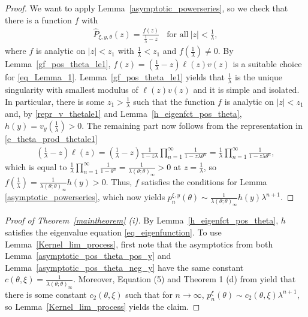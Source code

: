 \documentclass[10pt,a4paper]{amsart}
\newcommand{\1}{\mathds{1}}
\begin{document}
\begin{proof}
    We want to apply Lemma~\ref{asymptotic_powerseries}, so we check that there is a function $f$ with
    \begin{align}
        \hat{P}_{\xi,y,\theta}(z)=\frac{f(z)}{\frac{1}{\lambda}-z}~~~~\text{for all}~|z|<\frac{1}{\lambda}\label{eq_Lemma_1},
    \end{align}
   where $f$ is analytic on $|z|<z_1$ with $\frac{1}{\lambda}<z_1$ and $f\left(\frac{1}{\lambda}\right)\neq 0$. 
   By Lemma~\ref{gf_pos_theta_le1}, $f(z)=\left(\frac{1}{\lambda}-z\right)\ell(z)v(z)$  is a suitable choice for \eqref{eq_Lemma_1}. Lemma~\ref{gf_pos_theta_le1} yields that $\frac{1}{\lambda}$ is the unique singularity with smallest modulus of $\ell(z)v(z)$ and it is simple and isolated. In particular, there is some $z_1>\frac{1}{\lambda}$ such that the function $f$ is analytic on $|z|<z_1$ and, by \eqref{repr_v_thetale1} and Lemma~\ref{h_eigenfct_pos_theta}, $h(y)=v_y\left(\frac{1}{\lambda}\right)>0$. The remaining part now follows from the representation in \eqref{e_theta_prod_thetale1}
   \begin{align*}
       \left(\frac{1}{\lambda}-z\right)\ell(z)=\left(\frac{1}{\lambda}-z\right)\frac{1}{1-z\lambda}\prod_{n=1}^\infty\frac{1}{1-z\lambda \theta^n}=\frac{1}{\lambda}\prod_{n=1}^\infty\frac{1}{1-z\lambda \theta^n},
   \end{align*}
   which is equal to $\frac{1}{\lambda}\prod_{n=1}^\infty\frac{1}{1-\theta^n}=\frac{1}{\lambda(\theta;\theta)_\infty}>0$ at $z=\frac{1}{\lambda}$, so $f\left(\frac{1}{\lambda}\right)=\frac{1}{\lambda(\theta;\theta)_\infty}h(y)>0$.
  Thus, $f$ satisfies the  conditions for Lemma \ref{asymptotic_powerseries}, which now yields $p_n^{\xi,y}(\theta)\sim \frac{1}{\lambda(\theta;\theta)_\infty}h(y)\lambda^{n+1}$.
\end{proof}

\begin{proof}[Proof of Theorem~\ref{maintheorem} (i)]
    By Lem\-ma~\ref{h_eigenfct_pos_theta}, $h$ satisfies the eigenvalue equation \eqref{eq_eigenfunction}. To use Lem\-ma~\ref{Kernel_lim_process}, first note that the asymptotics from both Lemma~\ref{asymptotic_pos_theta_pos_y} and Lemma~\ref{asymptotic_pos_theta_neg_y} have the same constant $c(\theta,\xi)=\frac{1}{\lambda(\theta;\theta)_\infty}$. Moreover, Equation (5) and Theorem 1 (d) from \cite{AR}
   yield that there is some constant $c_2(\theta,\xi)$ such that for $n\to\infty$, $p_n^{\xi}(\theta)\sim c_2(\theta,\xi)\lambda^{n+1}$, so
      Lemma~\ref{Kernel_lim_process} yields the claim.
\end{proof}
\end{document}

